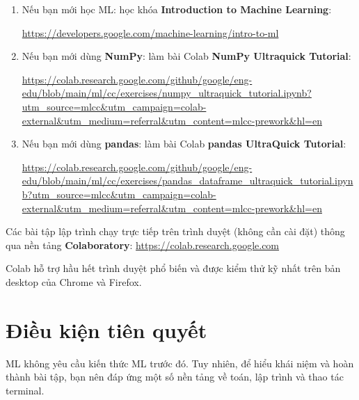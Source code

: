 \documentclass[12pt,a4paper]{article}
\newcommand{\mlccurl}[1]{\url{#1}}
\begin{document}
\begin{phuongphap}[title={Những việc nên làm trước khi học ML}]
\begin{enumerate}
  \item Nếu bạn mới học ML: học khóa \textbf{Introduction to Machine Learning}:

  \mlccurl{https://developers.google.com/machine-learning/intro-to-ml}

  \item Nếu bạn mới dùng \textbf{NumPy}: làm bài Colab \textbf{NumPy Ultraquick Tutorial}:

  \mlccurl{https://colab.research.google.com/github/google/eng-edu/blob/main/ml/cc/exercises/numpy_ultraquick_tutorial.ipynb?utm_source=mlcc&utm_campaign=colab-external&utm_medium=referral&utm_content=mlcc-prework&hl=en}

  \item Nếu bạn mới dùng \textbf{pandas}: làm bài Colab \textbf{pandas UltraQuick Tutorial}:

  \mlccurl{https://colab.research.google.com/github/google/eng-edu/blob/main/ml/cc/exercises/pandas_dataframe_ultraquick_tutorial.ipynb?utm_source=mlcc&utm_campaign=colab-external&utm_medium=referral&utm_content=mlcc-prework&hl=en}
\end{enumerate}
\end{phuongphap}

\begin{ynghia}[title={Colaboratory (Colab)}]
Các bài tập lập trình chạy trực tiếp trên trình duyệt (không cần cài đặt) thông qua nền tảng \textbf{Colaboratory}:
\mlccurl{https://colab.research.google.com}

Colab hỗ trợ hầu hết trình duyệt phổ biến và được kiểm thử kỹ nhất trên bản desktop của Chrome và Firefox.
\end{ynghia}

\newpage

\section{Điều kiện tiên quyết}

\begin{dongco}[title={Không cần biết ML trước, nhưng cần nền tảng}]
ML không yêu cầu kiến thức ML trước đó. Tuy nhiên, để hiểu khái niệm và hoàn thành bài tập, bạn nên đáp ứng một số nền tảng về toán, lập trình và thao tác terminal.
\end{dongco}
\end{document}
